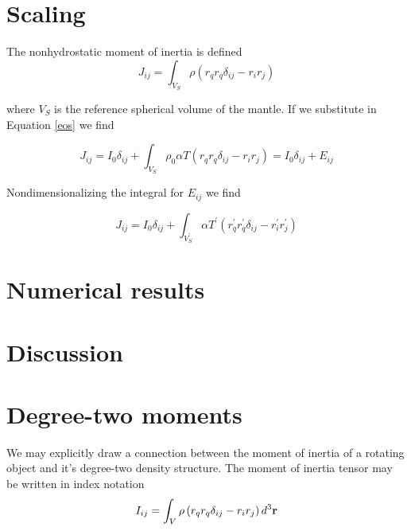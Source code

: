 \documentclass[extra]{gji}
\begin{document}
\section{Scaling}

The nonhydrostatic moment of inertia is defined
\begin{equation}
J_{ij} = \int_{V_S} \rho \left( r_q r_q \delta_{ij} - r_i r_j \right) 
\end{equation}

where $V_S$ is the reference spherical volume of the mantle.
If we substitute in Equation \ref{eos} we find

\begin{equation}
J_{ij} = I_0 \delta_{ij} + \int_{V_S} \rho_0 \alpha T \left( r_q r_q \delta_{ij} - r_i r_j \right) = I_0 \delta_{ij} + E_{ij} 
\end{equation}

Nondimensionalizing the integral for $E_{ij}$ we find

\begin{equation}
J_{ij} = I_0 \delta_{ij} + \int_{V_S^\prime} \alpha T^\prime \left( r_q^\prime r_q^\prime \delta_{ij} - r_i^\prime r_j^\prime \right) 
\end{equation}

\section{Numerical results}

\section{Discussion}




\begin{acknowledgments}
\end{acknowledgments}





\appendix

\section{Degree-two moments}

We may explicitly draw a connection between the moment of inertia of a rotating object and it's degree-two density structure.  The moment of inertia tensor may be written in index notation
\begin{equation}
I_{ij} = \int_V \rho \left( r_q r_q \delta_{ij} - r_i r_j \right) d^3 {\bf r}
\label{inertia}
\end{equation}
\end{document}
